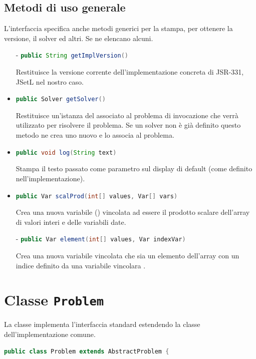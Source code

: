 \subsection{Metodi di uso generale}
L'interfaccia  specifica anche metodi generici per la stampa,
per ottenere la versione, il solver ed altri. Se ne elencano
alcuni.
\begin{itemize}
\item[-]\lstinline[language = Java]$public String getImplVersion()$

Restituisce la versione corrente
dell'implementazione concreta di JSR-331, JSetL nel nostro caso.

\item[-]\lstinline[language = Java]$public Solver getSolver()$ 

Restituisce un'istanza
del  associato al problema di invocazione che verrà utilizzato
per risolvere il problema. Se un solver non è già definito questo metodo ne
crea uno nuovo e lo associa al problema.

\item[-]\lstinline[language = Java]$public void log(String text)$ 

Stampa il testo passato come
parametro sul display di default (come definito nell'implementazione).

\item[-]\lstinline[language = Java]$public Var scalProd(int[] values, Var[] vars)$

Crea una nuova variabile ()
 vincolata ad essere il prodotto scalare dell'array di valori interi e
delle variabili date.
\item[-]\lstinline[language = Java]$public Var element(int[] values, Var indexVar)$ 

Crea una nuova variabile vincolata
che sia un elemento dell'array  con un indice definito da una
variabile vincolara .
\end{itemize}

\section{Classe \texttt{Problem}}\label{problem}
La classe  implementa l'interfaccia standard 
estendendo la classe  dell'implementazione comune.
\begin{lstlisting}[language = Java, frame = single]
public class Problem extends AbstractProblem {
\end{lstlisting}

